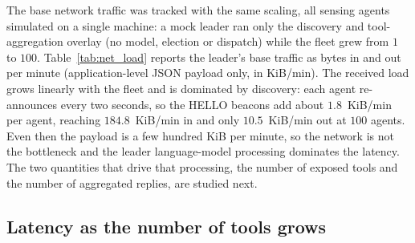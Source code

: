 The base network traffic was tracked with the same scaling, all sensing agents
simulated on a single machine: a mock leader ran only the discovery and
tool-aggregation overlay (no model, election or dispatch) while the fleet grew from
$1$ to $100$. Table~\ref{tab:net_load} reports the leader's base traffic as bytes in
and out per minute (application-level JSON payload only, in KiB/min). The received
load grows linearly with the fleet and is dominated by discovery: each agent
re-announces every two seconds, so the HELLO beacons add about $1.8$~KiB/min per
agent, reaching $184.8$~KiB/min in and only $10.5$~KiB/min out at $100$ agents. Even
then the payload is a few hundred KiB per minute, so the network is not the
bottleneck and the leader language-model processing dominates the latency. The two
quantities that drive that processing, the number of exposed tools and the number of
aggregated replies, are studied next.



\subsection{Latency as the number of tools grows}
\label{subsub:latency:tools}

